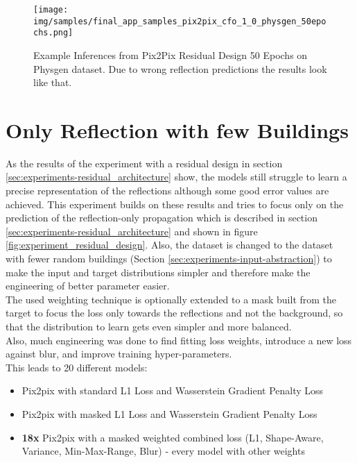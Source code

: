 		\begin{figure}[H]
			\centering
			\texttt{[image: img/samples/final\_app\_samples\_pix2pix\_cfo\_1\_0\_physgen\_50epochs.png]}
			\caption[Example Inferences from Pix2Pix Residual Design 50 Epochs on Physgen dataset. Due to wrong reflection predictions the results look like that.]{Example Inferences from Pix2Pix Residual Design 50 Epochs on Physgen dataset. Due to wrong reflection predictions the results look like that.}
			\label{fig:experiment_residual_pix2pix_examples}
		\end{figure}
		\FloatBarrier
		
	\clearpage
	
	\section{Only Reflection with few Buildings}
	\label{sec:experiments-only_reflections_with_few_buildings}
		As the results of the experiment with a residual design in section \ref{sec:experiments-residual_architecture} show, the models still struggle to learn a precise representation of the reflections although some good error values are achieved. This experiment builds on these results and tries to focus only on the prediction of the reflection-only propagation which is described in section \ref{sec:experiments-residual_architecture} and shown in figure \ref{fig:experiment_residual_design}. Also, the dataset is changed to the dataset with fewer random buildings (Section \ref{sec:experiments-input-abstraction}) to make the input and target distributions simpler and therefore make the engineering of better parameter easier.\\
		The used weighting technique is optionally extended to a mask built from the target to focus the loss only towards the reflections and not the background, so that the distribution to learn gets even simpler and more balanced.\\
		Also, much engineering was done to find fitting loss weights, introduce a new loss against blur, and improve training hyper-parameters. \\
		This leads to 20 different models:
		\begin{itemize}[itemsep=1mm, parsep=0pt]
			\item Pix2pix with standard L1 Loss and Wasserstein Gradient Penalty Loss
			\item Pix2pix with masked L1 Loss and Wasserstein Gradient Penalty Loss
			\item \textbf{18x} Pix2pix with a masked weighted combined loss (L1, Shape-Aware, Variance, Min-Max-Range, Blur) - every model with other weights
		\end{itemize}
		
